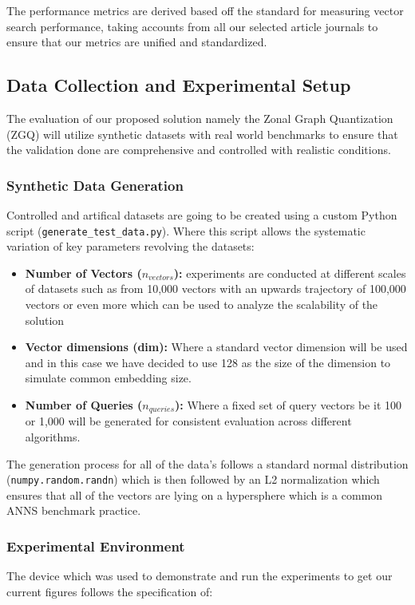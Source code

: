 \documentclass[conference]{IEEEtran}
\begin{document}
The performance metrics are derived based off the standard for measuring vector search performance, taking accounts from all our selected article journals to ensure that our metrics are unified and standardized.

\subsection{Data Collection and Experimental Setup}
The evaluation of our proposed solution namely the Zonal Graph Quantization (ZGQ) will utilize synthetic datasets with real world benchmarks to ensure that the validation done are comprehensive and controlled with realistic conditions.

\subsubsection{Synthetic Data Generation}
Controlled and artifical datasets are going to be created using a custom Python script (\texttt{generate\_test\_data.py}). Where this script allows the systematic variation of key parameters revolving the datasets:

\begin{itemize}
\item \textbf{Number of Vectors ($n_{vectors}$):} experiments are conducted at different scales of datasets such as from 10,000 vectors with an upwards trajectory of 100,000 vectors or even more which can be used to analyze the scalability of the solution
\item \textbf{Vector dimensions (dim):} Where a standard vector dimension will be used and in this case we have decided to use 128 as the size of the dimension to simulate common embedding size.
\item \textbf{Number of Queries ($n_{queries}$):} Where a fixed set of query vectors be it 100 or 1,000 will be generated for consistent evaluation across different algorithms.
\end{itemize}

The generation process for all of the data's follows a standard normal distribution (\texttt{numpy.random.randn}) which is then followed by an L2 normalization which ensures that all of the vectors are lying on a hypersphere which is a common ANNS benchmark practice.

\subsubsection{Experimental Environment}
The device which was used to demonstrate and run the experiments to get our current figures follows the specification of:
\end{document}
